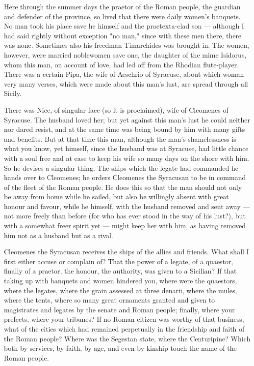 Here through the summer days the praetor of the Roman people, the guardian and defender of the province, so lived that there were daily women's banquets. No man took his place save he himself and the praetexta-clad son --- although I had said rightly without exception "no man," since with these men there, there was none. Sometimes also his freedman Timarchides was brought in. The women, however, were married noblewomen save one, the daughter of the mime Isidorus, whom this man, on account of love, had led off from the Rhodian flute-player. There was a certain Pipa, the wife of Aeschrio of Syracuse, about which woman very many verses, which were made about this man's lust, are spread through all Sicily.

 There was Nice, of singular face (so it is proclaimed), wife of Cleomenes of Syracuse. The husband loved her; but yet against this man's lust he could neither nor dared resist, and at the same time was being bound by him with many gifts and benefits. But at that time this man, although the man's shamelessness is what you know, yet himself, since the husband was at Syracuse, had little chance with a soul free and at ease to keep his wife so many days on the shore with him. So he devises a singular thing. The ships which the legate had commanded he hands over to Cleomenes; he orders Cleomenes the Syracusan to be in command of the fleet of the Roman people. He does this so that the man should not only be away from home while he sailed, but also be willingly absent with great honour and favour, while he himself, with the husband removed and sent away --- not more freely than before (for who has ever stood in the way of his lust?), but with a somewhat freer spirit yet --- might keep her with him, as having removed him not as a husband but as a rival.

 Cleomenes the Syracusan receives the ships of the allies and friends. What shall I first either accuse or complain of? That the power of a legate, of a quaestor, finally of a praetor, the honour, the authority, was given to a Sicilian? If that taking up with banquets and women hindered you, where were the quaestors, where the legates, where the grain assessed at three denarii, where the mules, where the tents, where so many great ornaments granted and given to magistrates and legates by the senate and Roman people; finally, where your prefects, where your tribunes? If no Roman citizen was worthy of that business, what of the cities which had remained perpetually in the friendship and faith of the Roman people? Where was the Segestan state, where the Centuripine? Which both by services, by faith, by age, and even by kinship touch the name of the Roman people.

